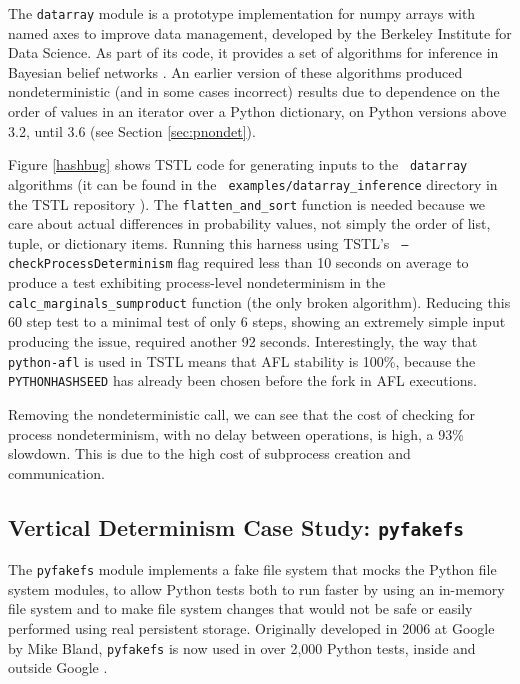 The {\tt datarray} module \cite{datarray} is a prototype
implementation for numpy arrays with named axes to improve data
management, developed by the Berkeley Institute for Data Science.  As part of its code, it provides a set of algorithms for
inference in
Bayesian belief networks \cite{russell2016artificial}.  An earlier
version of these algorithms produced nondeterministic (and in some
cases incorrect) results due to dependence on the order of values in
an iterator over a Python dictionary, on Python versions above 3.2,
until 3.6 (see Section \ref{sec:pnondet}).  

Figure \ref{hashbug} shows TSTL code for generating inputs to the {\tt
  datarray} algorithms (it can be found in the {\tt
  examples/datarray\_inference} directory in the TSTL repository \cite{tstl}).  The {\tt flatten\_and\_sort} function is needed because we care about actual differences in probability values, not simply the order of list, tuple, or dictionary items.  Running this harness using TSTL's {\tt
  --checkProcessDeterminism} flag required less than 10 seconds on
average to produce a test exhibiting process-level nondeterminism in
the {\tt calc\_marginals\_sumproduct} function (the only broken
algorithm).  Reducing this 60 step test to a minimal test of only 6 steps,
showing an extremely simple input producing the issue, 
required another 92 seconds.  Interestingly, the way that {\tt
  python-afl} is used in TSTL means that AFL stability is 100\%,
because the {\tt PYTHONHASHSEED} has already been chosen before the
fork in AFL executions.

Removing the nondeterministic call, we can see that the cost of
checking for process nondeterminism, with no delay between operations,
is high, a 93\% slowdown.  This is due to the high cost of subprocess
creation and communication.


\subsection {Vertical Determinism Case Study: {\tt pyfakefs}}

The {\tt pyfakefs} \cite{pyfakefs} module implements a fake file
system that mocks the Python file system modules, to allow Python
tests both to run faster by using an in-memory file system and to make
file system changes that would not be safe or easily performed using
real persistent storage.  Originally developed in 2006 at Google by
Mike Bland, {\tt pyfakefs} is now used in over 2,000 Python tests,
inside and outside Google \cite{pyfakefs}.

